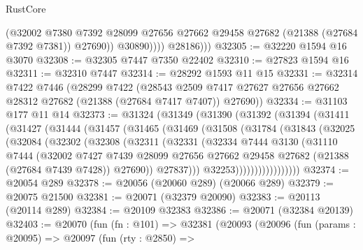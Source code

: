 \begin{lexlean}{RustCore}
\begin{coremodule}
                    (@32002
                      @7380
                      @7392
                      @28099
                      @27656
                      @27662
                      @29458
                      @27682
                      (@21388 (@27684 @7392 @7381))
                      @27690))
                  @30890))))
          @28186)))
@32305 := @32220 @1594 @16 @3070
@32308 := @32305 @7447 @7350 @22402
@32310 := @27823 @1594 @16
@32311 := @32310 @7447
@32314 := @28292 @1593 @11 @15
@32331 := @32314
    @7422
    @7446
    (@28299
      @7422
      (@28543 @2509 @7417 @27627 @27656 @27662 @28312 @27682 (@21388 (@27684 @7417 @7407)) @27690))
@32334 := @31103 @177 @11 @14
@32373 := @31324
    (@31349
      (@31390
        (@31392
          (@31394
            (@31411
              (@31427
                (@31444
                  (@31457
                    (@31465
                      (@31469
                        (@31508
                          (@31784
                            (@31843
                              (@32025
                                (@32084
                                  (@32302
                                    (@32308
                                      (@32311
                                        (@32331
                                          (@32334
                                            @7444
                                            @3130
                                            (@31110
                                              @7444
                                              (@32002
                                                @7427
                                                @7439
                                                @28099
                                                @27656
                                                @27662
                                                @29458
                                                @27682
                                                (@21388 (@27684 @7439 @7428))
                                                @27690))
                                            @27837)))
                                      @32253)))))))))))))))))
@32374 := @20054 @289
@32378 := @20056 (@20060 @289) (@20066 @289)
@32379 := @20075 @21500
@32381 := @20071 (@32379 @20090)
@32383 := @20113 (@20114 @289)
@32384 := @20109 @32383
@32386 := @20071 (@32384 @20139)
@32403 := @20070
    (fun (fn : @101) =>
    @32381
      (@20093
        (@20096
          (fun (params : @20095) =>
          @20097
            (fun (rty : @2850) =>

\end{coremodule}
\end{lexlean}
